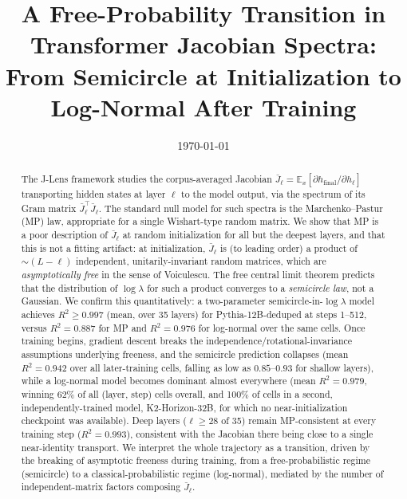 \documentclass[11pt,a4paper]{article}
\title{\textbf{A Free-Probability Transition in Transformer Jacobian Spectra:}\\
\large From Semicircle at Initialization to Log-Normal After Training}
\author{}
\date{\today}
\begin{document}
\maketitle

\begin{abstract}
The J-Lens framework studies the corpus-averaged Jacobian $\bar{J}_\ell = \mathbb{E}_x[\partial h_{\mathrm{final}}/\partial h_\ell]$ transporting hidden states at layer $\ell$ to the model output, via the spectrum of its Gram matrix $\bar{J}_\ell^\top \bar{J}_\ell$. The standard null model for such spectra is the Marchenko--Pastur (MP) law, appropriate for a single Wishart-type random matrix. We show that MP is a poor description of $\bar{J}_\ell$ at random initialization for all but the deepest layers, and that this is not a fitting artifact: at initialization, $\bar{J}_\ell$ is (to leading order) a product of $\sim\!(L-\ell)$ independent, unitarily-invariant random matrices, which are \emph{asymptotically free} in the sense of Voiculescu. The free central limit theorem predicts that the distribution of $\log\lambda$ for such a product converges to a \emph{semicircle law}, not a Gaussian. We confirm this quantitatively: a two-parameter semicircle-in-$\log\lambda$ model achieves $R^2 \geq 0.997$ (mean, over 35 layers) for Pythia-12B-deduped at steps 1--512, versus $R^2 = 0.887$ for MP and $R^2=0.976$ for log-normal over the same cells. Once training begins, gradient descent breaks the independence/rotational-invariance assumptions underlying freeness, and the semicircle prediction collapses (mean $R^2 = 0.942$ over all later-training cells, falling as low as $0.85$--$0.93$ for shallow layers), while a log-normal model becomes dominant almost everywhere (mean $R^2=0.979$, winning 62\% of all (layer, step) cells overall, and 100\% of cells in a second, independently-trained model, K2-Horizon-32B, for which no near-initialization checkpoint was available). Deep layers ($\ell \geq 28$ of 35) remain MP-consistent at every training step ($R^2 = 0.993$), consistent with the Jacobian there being close to a single near-identity transport. We interpret the whole trajectory as a transition, driven by the breaking of asymptotic freeness during training, from a free-probabilistic regime (semicircle) to a classical-probabilistic regime (log-normal), mediated by the number of independent-matrix factors composing $\bar{J}_\ell$.
\end{abstract}

\tableofcontents
\newpage

\end{document}
